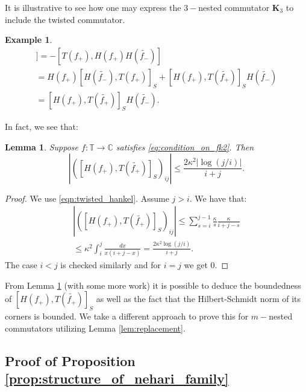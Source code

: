 \documentclass[11pt]{amsart}
\theoremstyle{plain}
\newtheorem{example}[theorem]{Example}
\newtheorem{lemma}[theorem]{Lemma}
\theoremstyle{remark}
\numberwithin{equation}{section}
\begin{document}
It is illustrative to see how one may express the $3-$nested commutator $\mathbf{K}_3$ to include the twisted commutator.
\begin{example}
\begin{multline}
[T(f_+),[T(f_+),T(f_-)]]=-[T(f_+), H(f_+)H(\widetilde{f_-})]
\\=H(f_+)[H(\widetilde{f_-}),T(f_+)]_S+[H(f_+), T(\widetilde{f_+})]_S H(\widetilde{f_-})
\\=[H(f_+), T(\widetilde{f_+})]_S H(\widetilde{f_-}).
\end{multline}
\end{example}

In fact, we see that:
\begin{lemma}\label{lem:bounded_twisted}
Suppose $f:\mathbb{T}\rightarrow\mathbb{C}$ satisfies \eqref{eq:condition_on_fk2}. Then
$$|([H(f_+), T(\widetilde{f_+})]_S)_{ij}|\leq \frac{2\kappa^2|\log(j/i)|}{i+j}.$$
\end{lemma}
\begin{proof}
We use \eqref{eqn:twisted_hankel}. Assume $j>i$. We have that:
\begin{multline}
|([H(f_+), T(\widetilde{f_+})]_{S})_{ij}|
  \leq \sum_{s=i}^{j-1}\frac{\kappa}{s}\frac{\kappa}{i+j-s}
  \\\leq \kappa^2\int_i^{j}\frac{dx}{x(i+j-x)}
  =\frac{2\kappa^2\log(j/i)}{i+j}.
\end{multline}
The case $i<j$ is checked similarly and for $i=j$ we get $0$.
\end{proof}
From Lemma \ref{lem:bounded_twisted} (with some more work) it is possible to deduce the boundedness of $[H(f_+), T(\widetilde{f_+})]_{S}$ as well as the fact that the Hilbert-Schmidt norm of its corners is bounded. We take a different approach to prove this for $m-$nested commutators utilizing Lemma \ref{lem:replacement}. 

\subsection{Proof of Proposition \ref{prop:structure_of_nehari_family}}
\end{document}
